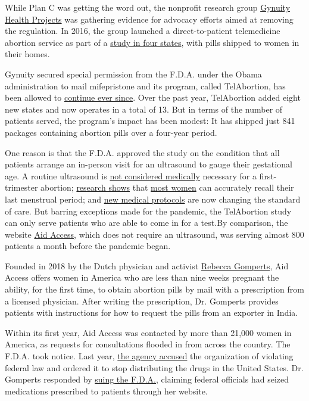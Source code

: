 While Plan C was getting the word out, the nonprofit research group
\href{https://gynuity.org/}{Gynuity Health Projects} was gathering
evidence for advocacy efforts aimed at removing the regulation. In 2016,
the group launched a direct-to-patient telemedicine abortion service as
part of a
\href{https://www.nytimes3xbfgragh.onion/2016/11/11/health/abortion-study-mail.html}{study
in four states}, with pills shipped to women in their homes.

Gynuity secured special permission from the F.D.A. under the Obama
administration to mail mifepristone and its program, called TelAbortion,
has been allowed to
\href{https://www.nytimes3xbfgragh.onion/2020/04/28/health/telabortion-abortion-telemedicine.html}{continue
ever since}. Over the past year, TelAbortion added eight new states and
now operates in a total of 13. But in terms of the number of patients
served, the program's impact has been modest: It has shipped just 841
packages containing abortion pills over a four-year period.

One reason is that the F.D.A. approved the study on the condition that
all patients arrange an in-person visit for an ultrasound to gauge their
gestational age. A routine ultrasound is
\href{https://www.guttmacher.org/state-policy/explore/requirements-ultrasound}{not
considered medically} necessary for a first-trimester abortion;
\href{https://www.ncbi.nlm.nih.gov/pubmed/21091926}{research shows} that
\href{https://www.ncbi.nlm.nih.gov/pubmed/25152258}{most women} can
accurately recall their last menstrual period; and
\href{https://www.ncbi.nlm.nih.gov/pmc/articles/PMC7161512/\#b0090}{new
medical protocols} are now changing the standard of care. But barring
exceptions made for the pandemic, the TelAbortion study can only serve
patients who are able to come in for a test.By comparison, the website
\href{https://aidaccess.org/}{Aid Access}, which does not require an
ultrasound, was serving almost 800 patients a month before the pandemic
began.

Founded in 2018 by the Dutch physician and activist
\href{https://www.nytimes3xbfgragh.onion/2001/08/26/magazine/the-pro-choice-extremist.html}{Rebecca
Gomperts}, Aid Access offers women in America who are less than nine
weeks pregnant the ability, for the first time, to obtain abortion pills
by mail with a prescription from a licensed physician. After writing the
prescription, Dr. Gomperts provides patients with instructions for how
to request the pills from an exporter in India.

Within its first year, Aid Access was contacted by more than 21,000
women in America, as requests for consultations flooded in from across
the country. The F.D.A. took notice. Last year,
\href{https://www.fda.gov/inspections-compliance-enforcement-and-criminal-investigations/warning-letters/aidaccessorg-575658-03082019}{the
agency accused} the organization of violating federal law and ordered it
to stop distributing the drugs in the United States. Dr. Gomperts
responded by
\href{https://www.npr.org/2019/09/09/758871490/european-doctor-who-prescribes-abortion-pills-to-u-s-women-online-sues-fda}{suing
the F.D.A.}, claiming federal officials had seized medications
prescribed to patients through her website.

